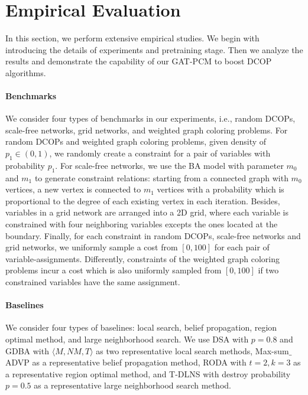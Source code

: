 \documentclass[letterpaper]{article} %
\begin{document}
\section{Empirical Evaluation}
In this section, we perform extensive empirical studies. We begin with introducing the details of experiments and pretraining stage. Then we analyze the results and demonstrate the capability of our GAT-PCM to boost DCOP algorithms.
\paragraph{Benchmarks} We consider four types of benchmarks in our experiments, i.e., random DCOPs, scale-free networks, grid networks, and weighted graph coloring problems. For random DCOPs and weighted graph coloring problems, given density of $p_1\in (0,1)$, we randomly create a constraint for a pair of variables with probability $p_1$. For scale-free networks, we use the BA model \cite{barabasi1999emergence} with parameter $m_0$ and $m_1$ to generate constraint relations: starting from a connected graph with $m_0$ vertices, a new vertex is connected to $m_1$ vertices with a probability which is proportional to the degree of each existing vertex in each iteration. Besides, variables in a grid network are arranged into a 2D grid, where each variable is constrained with four neighboring variables excepts the ones located at the boundary. Finally, for each constraint in random DCOPs, scale-free networks and grid networks, we uniformly sample a cost from $[0,100]$ for each pair of variable-assignments. Differently, constraints of the weighted graph coloring problems incur a cost which is also uniformly sampled from $[0,100]$ if two constrained variables have the same assignment.

\paragraph{Baselines}We consider four types of baselines: local search, belief propagation, region optimal method, and large neighborhood search. We use DSA \cite{Zhang2005Distributed} with $p=0.8$ and GDBA \cite{okamoto2016distributed} with $\langle M,NM, T\rangle$ as two representative local search methods, Max-sum$\_$ADVP \cite{zivan2017balancing} as a representative belief propagation method, RODA \cite{grinshpoun2019privacy} with $t=2,k=3$ as a representative region optimal method, and T-DLNS \cite{hoang2018large} with destroy probability $p=0.5$ as a representative large neighborhood search method.
\end{document}
